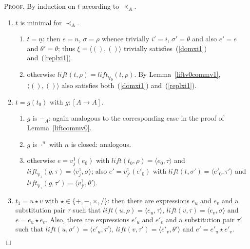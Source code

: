 \documentclass{article}
\newenvironment{proof}{\smallskip\textsc{Proof.}}{\hspace*{\fill}$\Box$}
\newcommand{\V}{{\mathbb V}}
\newcommand{\less}{\mathrel{\prec_A}}
\newcommand{\liftv}[1]{\ensuremath{\mathit{lift}_{\V_{#1}}}}
\newcommand{\lift}{\ensuremath{\mathit{lift}}}
\newcommand{\idn}{()}
\begin{document}
\begin{proof}
By induction on $t$ according to $\less$.
\begin{enumerate}
\item $t$ is minimal for $\less$.
\begin{enumerate}
\item $t=\underline n$: then $e=n$, $\sigma=\rho$ whence trivially
$i'=i$, $\sigma'=\theta$ and also $e'=e$ and $\theta'=\theta$;
thus $\xi=\langle\idn,\idn\rangle$ trivially
satisfies~(\ref{domxi1}) and~(\ref{replxi1}).
\item otherwise $\lift(t,\rho)=\liftv0(t,\rho)$.  By
Lemma~\ref{liftv0commv1}, $\langle\idn,\idn\rangle$ also satisfies
both~(\ref{domxi1}) and~(\ref{replxi1}).
\end{enumerate}
\item $t=g(t_0)$ with $g:[A\to A]$.
\begin{enumerate}
\item $g$ is $-_A$: again analogous to the corresponding case in the
proof of Lemma~\ref{liftcommv0}.
\item $g$ is $\cdot^n$ with $n$ is closed: analogous.
\item otherwise $e=v^1_j(e_0)$ with
$\lift(t_0,\rho)=\langle e_0,\tau\rangle$ and
$\liftv1(g,\tau)=\langle v^1_j,\sigma\rangle$;
also $e'=v^1_{j'}(e'_0)$ with $\lift(t,\sigma')=\langle
e'_0,\tau'\rangle$ and $\liftv1(g,\tau')=\langle v^1_{j'},\theta'\rangle$.
\end{enumerate}
\item $t_1=u\star v$ with $\star\in\{+,-,\times,/\}$: then there are
expressions $e_u$ and $e_v$ and a substitution pair $\tau$ such that
$\lift(u,\rho)=\langle e_u,\tau\rangle$, $\lift(v,\tau)=\langle
e_v,\sigma\rangle$ and $e=e_u\star e_v$.  Also, there are expressions
$e'_u$ and $e'_v$ and a substitution pair $\tau'$ such that
$\lift(u,\sigma')=\langle e'_u,\tau'\rangle$, $\lift(v,\tau')=\langle
e'_v,\theta'\rangle$ and $e'=e'_u\star e'_v$.


\end{enumerate}
\end{proof}
\end{document}
